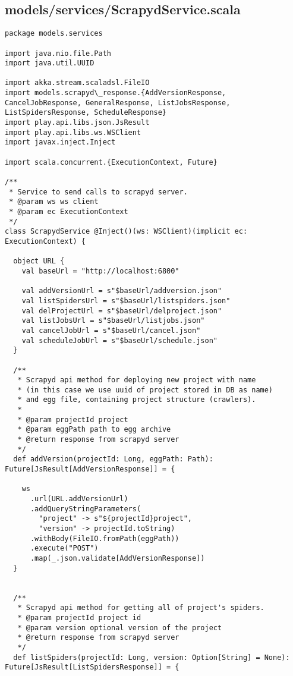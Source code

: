 \subsection{models/services/ScrapydService.scala}
\begin{lstlisting}
package models.services

import java.nio.file.Path
import java.util.UUID

import akka.stream.scaladsl.FileIO
import models.scrapyd\_response.{AddVersionResponse, CancelJobResponse, GeneralResponse, ListJobsResponse, ListSpidersResponse, ScheduleResponse}
import play.api.libs.json.JsResult
import play.api.libs.ws.WSClient
import javax.inject.Inject

import scala.concurrent.{ExecutionContext, Future}

/**
 * Service to send calls to scrapyd server.
 * @param ws ws client
 * @param ec ExecutionContext
 */
class ScrapydService @Inject()(ws: WSClient)(implicit ec: ExecutionContext) {

  object URL {
    val baseUrl = "http://localhost:6800"

    val addVersionUrl = s"$baseUrl/addversion.json"
    val listSpidersUrl = s"$baseUrl/listspiders.json"
    val delProjectUrl = s"$baseUrl/delproject.json"
    val listJobsUrl = s"$baseUrl/listjobs.json"
    val cancelJobUrl = s"$baseUrl/cancel.json"
    val scheduleJobUrl = s"$baseUrl/schedule.json"
  }

  /**
   * Scrapyd api method for deploying new project with name
   * (in this case we use uuid of project stored in DB as name)
   * and egg file, containing project structure (crawlers).
   *
   * @param projectId project
   * @param eggPath path to egg archive
   * @return response from scrapyd server
   */
  def addVersion(projectId: Long, eggPath: Path): Future[JsResult[AddVersionResponse]] = {

    ws
      .url(URL.addVersionUrl)
      .addQueryStringParameters(
        "project" -> s"${projectId}project",
        "version" -> projectId.toString)
      .withBody(FileIO.fromPath(eggPath))
      .execute("POST")
      .map(_.json.validate[AddVersionResponse])
  }


  /**
   * Scrapyd api method for getting all of project's spiders.
   * @param projectId project id
   * @param version optional version of the project
   * @return response from scrapyd server
   */
  def listSpiders(projectId: Long, version: Option[String] = None): Future[JsResult[ListSpidersResponse]] = {


\end{lstlisting}
